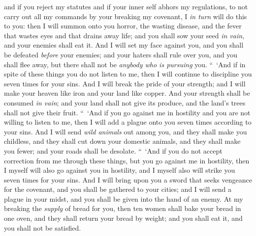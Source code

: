 \begin{biblechapter}
\verse and if you reject my statutes and if your inner self abhors my regulations, to not carry out all my commands by your breaking my covenant,
\verse I \textit{in turn} will do this to you: then I will summon onto you horror, the wasting disease, and the fever that wastes eyes and that drains away life; and you shall sow your seed \textit{in vain}, and your enemies shall eat it.
\verse And I will set my face against you, and you shall be defeated \textit{before} your enemies; and your haters shall rule over you, and you shall flee away, but there shall not be \textit{anybody who is pursuing} you.
\verse “ ‘And if in spite of these things you do not listen to me, then I will continue to discipline you seven times for your sins.
\verse And I will break the pride of your strength; and I will make your heaven like iron and your land like copper.
\verse And your strength shall be consumed \textit{in vain}; and your land shall not give its produce, and the land’s trees shall not give their fruit.
\verse “ ‘And if you go against me in hostility and you are not willing to listen to me, then I will add a plague onto you seven times according to your sins.
\verse And I will send \textit{wild animals} out among you, and they shall make you childless, and they shall cut down your domestic animals, and they shall make you fewer; and your roads shall be desolate.
\verse “ ‘And if you do not accept correction from me through these things, but you go against me in hostility,
\verse then I myself will also go against you in hostility, and I myself also will strike you seven times for your sins.
\verse And I will bring upon you a sword that seeks vengeance for the covenant, and you shall be gathered to your cities; and I will send a plague in your midst, and you shall be given into the hand of an enemy.
\verse At my breaking the \textit{supply} of bread for you, then ten women shall bake your bread in one oven, and they shall return your bread by weight; and you shall eat it, and you shall not be satisfied.

\end{biblechapter}
